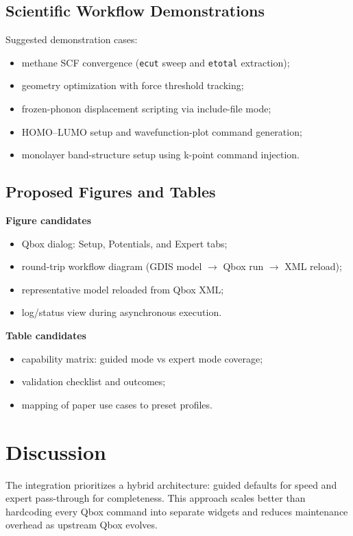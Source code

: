 \documentclass[11pt,a4paper]{article}
\begin{document}
\subsection{Scientific Workflow Demonstrations}
Suggested demonstration cases:
\begin{itemize}
  \item methane SCF convergence (\texttt{ecut} sweep and \texttt{etotal} extraction);
  \item geometry optimization with force threshold tracking;
  \item frozen-phonon displacement scripting via include-file mode;
  \item HOMO--LUMO setup and wavefunction-plot command generation;
  \item monolayer band-structure setup using k-point command injection.
\end{itemize}

\subsection{Proposed Figures and Tables}
\textbf{Figure candidates}
\begin{itemize}
  \item Qbox dialog: Setup, Potentials, and Expert tabs;
  \item round-trip workflow diagram (GDIS model $\rightarrow$ Qbox run $\rightarrow$ XML reload);
  \item representative model reloaded from Qbox XML;
  \item log/status view during asynchronous execution.
\end{itemize}

\textbf{Table candidates}
\begin{itemize}
  \item capability matrix: guided mode vs expert mode coverage;
  \item validation checklist and outcomes;
  \item mapping of paper use cases to preset profiles.
\end{itemize}

\section{Discussion}
The integration prioritizes a hybrid architecture: guided defaults for speed and expert pass-through for completeness.
This approach scales better than hardcoding every Qbox command into separate widgets and reduces maintenance overhead as upstream Qbox evolves.
\end{document}
